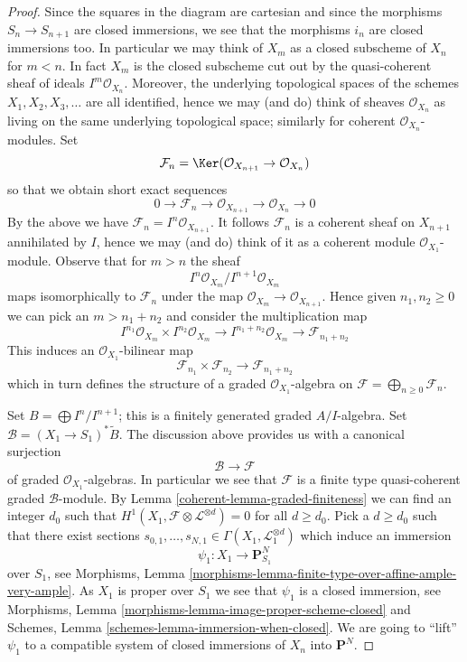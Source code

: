 \begin{proof}

Since the squares in the diagram are cartesian and since the morphisms
$S_n \to S_{n + 1}$ are closed immersions, we see that the morphisms
$i_n$ are closed immersions too. In particular we may think of
$X_m$ as a closed subscheme of $X_n$ for $m < n$. In fact $X_m$ is
the closed subscheme cut out by the quasi-coherent sheaf of ideals
$I^m\mathcal{O}_{X_n}$. Moreover, the underlying topological spaces
of the schemes $X_1, X_2, X_3, \ldots$ are all identified, hence we
may (and do) think of sheaves $\mathcal{O}_{X_n}$ as living on the
same underlying topological space; similarly for coherent
$\mathcal{O}_{X_n}$-modules. Set
$$
\mathcal{F}_n =
\Ker(\mathcal{O}_{X_{n + 1}} \to \mathcal{O}_{X_n})
$$
so that we obtain short exact sequences
$$
0 \to \mathcal{F}_n \to \mathcal{O}_{X_{n + 1}} \to \mathcal{O}_{X_n} \to 0
$$
By the above we have $\mathcal{F}_n = I^n\mathcal{O}_{X_{n + 1}}$.
It follows $\mathcal{F}_n$ is a coherent sheaf on $X_{n + 1}$
annihilated by $I$, hence we may (and do) think of it as a coherent
module $\mathcal{O}_{X_1}$-module. Observe that for $m > n$ the sheaf
$$
I^n\mathcal{O}_{X_m}/I^{n + 1}\mathcal{O}_{X_m}
$$
maps isomorphically to $\mathcal{F}_n$ under the map
$\mathcal{O}_{X_m} \to \mathcal{O}_{X_{n + 1}}$. Hence given
$n_1, n_2 \geq 0$ we can pick an $m > n_1 + n_2$ and consider the
multiplication map
$$
I^{n_1}\mathcal{O}_{X_m} \times I^{n_2}\mathcal{O}_{X_m}
\longrightarrow
I^{n_1 + n_2}\mathcal{O}_{X_m} \to \mathcal{F}_{n_1 + n_2}
$$
This induces an $\mathcal{O}_{X_1}$-bilinear map
$$
\mathcal{F}_{n_1} \times \mathcal{F}_{n_2} \longrightarrow
\mathcal{F}_{n_1 + n_2}
$$
which in turn defines the structure of a graded $\mathcal{O}_{X_1}$-algebra
on $\mathcal{F} = \bigoplus_{n \geq 0} \mathcal{F}_n$.

\medskip\noindent
Set $B = \bigoplus I^n/I^{n + 1}$; this is a finitely generated
graded $A/I$-algebra. Set $\mathcal{B} = (X_1 \to S_1)^*\widetilde{B}$.
The discussion above provides us with a canonical surjection
$$
\mathcal{B} \longrightarrow \mathcal{F}
$$
of graded $\mathcal{O}_{X_1}$-algebras. In particular we see that
$\mathcal{F}$ is a finite type quasi-coherent graded $\mathcal{B}$-module.
By Lemma \ref{coherent-lemma-graded-finiteness} we can find an integer $d_0$
such that $H^1(X_1, \mathcal{F} \otimes \mathcal{L}^{\otimes d}) = 0$
for all $d \geq d_0$. Pick a $d \geq d_0$ such that there exist sections
$s_{0, 1}, \ldots, s_{N, 1} \in \Gamma(X_1, \mathcal{L}_1^{\otimes d})$
which induce an immersion
$$
\psi_1 : X_1 \to \mathbf{P}^N_{S_1}
$$
over $S_1$, see
Morphisms, Lemma \ref{morphisms-lemma-finite-type-over-affine-ample-very-ample}.
As $X_1$ is proper over $S_1$ we see that $\psi_1$
is a closed immersion, see
Morphisms, Lemma \ref{morphisms-lemma-image-proper-scheme-closed}
and
Schemes, Lemma \ref{schemes-lemma-immersion-when-closed}.
We are going to ``lift'' $\psi_1$ to a compatible system of
closed immersions of $X_n$ into $\mathbf{P}^N$.


\end{proof}
